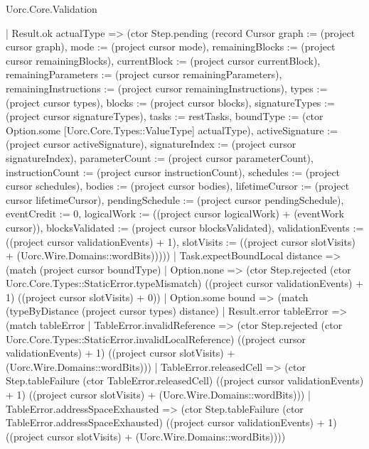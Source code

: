 \begin{lexlean}{Uorc.Core.Validation}
\begin{semanticmodule}
{        | Result.ok actualType => (ctor Step.pending (record Cursor {graph := (project cursor graph), mode := (project cursor mode), remainingBlocks := (project cursor remainingBlocks), currentBlock := (project cursor currentBlock), remainingParameters := (project cursor remainingParameters), remainingInstructions := (project cursor remainingInstructions), types := (project cursor types), blocks := (project cursor blocks), signatureTypes := (project cursor signatureTypes), tasks := restTasks, boundType := (ctor Option.some [Uorc.Core.Types::ValueType] actualType), activeSignature := (project cursor activeSignature), signatureIndex := (project cursor signatureIndex), parameterCount := (project cursor parameterCount), instructionCount := (project cursor instructionCount), schedules := (project cursor schedules), bodies := (project cursor bodies), lifetimeCursor := (project cursor lifetimeCursor), pendingSchedule := (project cursor pendingSchedule), eventCredit := 0, logicalWork := ((project cursor logicalWork) + (eventWork cursor)), blocksValidated := (project cursor blocksValidated), validationEvents := ((project cursor validationEvents) + 1), slotVisits := ((project cursor slotVisits) + (Uorc.Wire.Domains::wordBits))})))
      | Task.expectBoundLocal distance => (match (project cursor boundType)
        | Option.none => (ctor Step.rejected (ctor Uorc.Core.Types::StaticError.typeMismatch) ((project cursor validationEvents) + 1) ((project cursor slotVisits) + 0))
        | Option.some bound => (match (typeByDistance (project cursor types) distance)
          | Result.error tableError => (match tableError
            | TableError.invalidReference => (ctor Step.rejected (ctor Uorc.Core.Types::StaticError.invalidLocalReference) ((project cursor validationEvents) + 1) ((project cursor slotVisits) + (Uorc.Wire.Domains::wordBits)))
            | TableError.releasedCell => (ctor Step.tableFailure (ctor TableError.releasedCell) ((project cursor validationEvents) + 1) ((project cursor slotVisits) + (Uorc.Wire.Domains::wordBits)))
            | TableError.addressSpaceExhausted => (ctor Step.tableFailure (ctor TableError.addressSpaceExhausted) ((project cursor validationEvents) + 1) ((project cursor slotVisits) + (Uorc.Wire.Domains::wordBits))))
}
\end{semanticmodule}
\end{lexlean}
